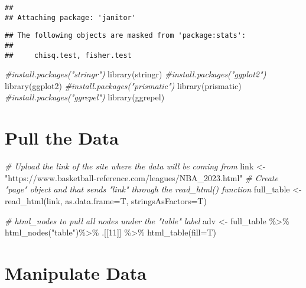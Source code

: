 \documentclass[
]{article}
\newenvironment{Shaded}{\begin{snugshade}}{\end{snugshade}}
\newcommand{\AttributeTok}[1]{\textcolor[rgb]{0.77,0.63,0.00}{#1}}
\newcommand{\CommentTok}[1]{\textcolor[rgb]{0.56,0.35,0.01}{\textit{#1}}}
\newcommand{\DecValTok}[1]{\textcolor[rgb]{0.00,0.00,0.81}{#1}}
\newcommand{\FunctionTok}[1]{\textcolor[rgb]{0.00,0.00,0.00}{#1}}
\newcommand{\NormalTok}[1]{#1}
\newcommand{\OtherTok}[1]{\textcolor[rgb]{0.56,0.35,0.01}{#1}}
\newcommand{\SpecialCharTok}[1]{\textcolor[rgb]{0.00,0.00,0.00}{#1}}
\newcommand{\StringTok}[1]{\textcolor[rgb]{0.31,0.60,0.02}{#1}}
\begin{document}
\begin{verbatim}
## 
## Attaching package: 'janitor'
\end{verbatim}

\begin{verbatim}
## The following objects are masked from 'package:stats':
## 
##     chisq.test, fisher.test
\end{verbatim}

\begin{Shaded}
\begin{Highlighting}[]
\CommentTok{\#install.packages("stringr")}
\FunctionTok{library}\NormalTok{(stringr)}
\CommentTok{\#install.packages("ggplot2")}
\FunctionTok{library}\NormalTok{(ggplot2)}
\CommentTok{\#install.packages("prismatic")}
\FunctionTok{library}\NormalTok{(prismatic)}
\CommentTok{\#install.packages("ggrepel")}
\FunctionTok{library}\NormalTok{(ggrepel)}
\end{Highlighting}
\end{Shaded}

\hypertarget{pull-the-data}{%
\section{\texorpdfstring{\textbf{Pull the
Data}}{Pull the Data}}\label{pull-the-data}}

\begin{Shaded}
\begin{Highlighting}[]
\CommentTok{\# Upload the link of the site where the data will be coming from }
\NormalTok{link }\OtherTok{\textless{}{-}}  \StringTok{"https://www.basketball{-}reference.com/leagues/NBA\_2023.html"}
\CommentTok{\# Create "page" object and that sends "link" through the read\_html() function}
\NormalTok{full\_table }\OtherTok{\textless{}{-}} \FunctionTok{read\_html}\NormalTok{(link, }\AttributeTok{as.data.frame=}\NormalTok{T, }\AttributeTok{stringsAsFactors=}\NormalTok{T)}

\CommentTok{\# html\_nodes to pull all nodes under the "table" label }
\NormalTok{adv }\OtherTok{\textless{}{-}}\NormalTok{ full\_table }\SpecialCharTok{\%\textgreater{}\%}
  \FunctionTok{html\_nodes}\NormalTok{(}\StringTok{"table"}\NormalTok{)}\SpecialCharTok{\%\textgreater{}\%}
\NormalTok{  .[[}\DecValTok{11}\NormalTok{]] }\SpecialCharTok{\%\textgreater{}\%}
  \FunctionTok{html\_table}\NormalTok{(}\AttributeTok{fill=}\NormalTok{T)}
\end{Highlighting}
\end{Shaded}

\hypertarget{manipulate-data}{%
\section{\texorpdfstring{\textbf{Manipulate
Data}}{Manipulate Data}}\label{manipulate-data}}
\end{document}
